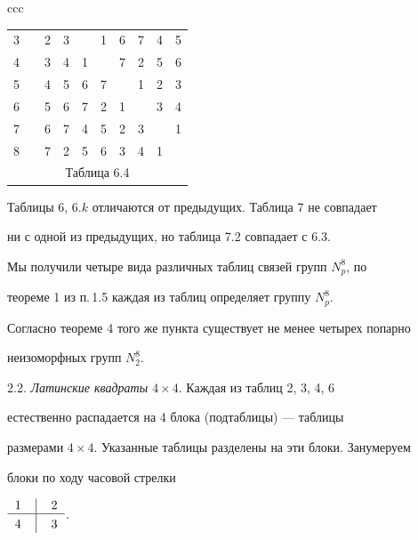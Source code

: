 \begin{center}
\begin{tabular}{ccc}
\begin{tabular}{cccccccccc}
3 & \vline & 2 & 3 & \ & 1 & 6 & 7 & 4 & 5 \\


4 & \vline & 3 & 4 & 1 & \ & 7 & 2 & 5 & 6 \\


5 & \vline & 4 & 5 & 6 & 7 & \ & 1 & 2 & 3 \\


6 & \vline & 5 & 6 & 7 & 2 & 1 & \ & 3 & 4 \\


7 & \vline & 6 & 7 & 4 & 5 & 2 & 3 & \ & 1 \\


8 & \vline & 7 & 2 & 5 & 6 & 3 & 4 & 1 & \ \\


\multicolumn{10}{c}{ Таблица 6.4}


\end{tabular}





\end{tabular}


\end{center}


\smallskip





\noindent{}Таблицы 6, $6.k$ отличаются от предыдущих. Таблица 7 не совпадает 


ни с одной из предыдущих, но таблица 7.2 совпадает с 6.3.





Мы получили четыре вида различных таблиц связей групп $N^8_p$, по


теореме 1 из п.\,1.5 каждая из таблиц определяет группу $N^8_p$. 


Согласно теореме 4 того же пункта существует не менее четырех попарно


неизоморфных групп $N^8_2$.


\medskip





2.2. {\it Латинские квадраты $4\times 4$}. Каждая из таблиц 2, 3, 4, 6


естественно распадается на 4 блока (подтаблицы) --- таблицы 


размерами $4\times 4$. Указанные таблицы разделены на эти блоки. Занумеруем


блоки по ходу часовой стрелки


$\begin{tabular}{ccc}1&\vline&2\\ \hline \rulea 4 &\vline & 3\end{tabular}$.


